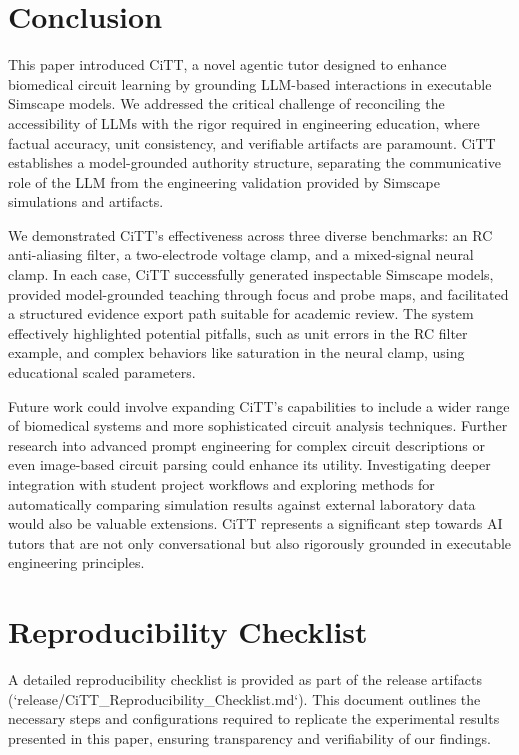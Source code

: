 \documentclass[10pt,twocolumn,letterpaper]{article}
\begin{document}
\section{Conclusion}
\label{sec:conclusion}
This paper introduced CiTT, a novel agentic tutor designed to enhance biomedical circuit learning by grounding LLM-based interactions in executable Simscape models. We addressed the critical challenge of reconciling the accessibility of LLMs with the rigor required in engineering education, where factual accuracy, unit consistency, and verifiable artifacts are paramount. CiTT establishes a model-grounded authority structure, separating the communicative role of the LLM from the engineering validation provided by Simscape simulations and artifacts.

We demonstrated CiTT's effectiveness across three diverse benchmarks: an RC anti-aliasing filter, a two-electrode voltage clamp, and a mixed-signal neural clamp. In each case, CiTT successfully generated inspectable Simscape models, provided model-grounded teaching through focus and probe maps, and facilitated a structured evidence export path suitable for academic review. The system effectively highlighted potential pitfalls, such as unit errors in the RC filter example, and complex behaviors like saturation in the neural clamp, using educational scaled parameters.

Future work could involve expanding CiTT's capabilities to include a wider range of biomedical systems and more sophisticated circuit analysis techniques. Further research into advanced prompt engineering for complex circuit descriptions or even image-based circuit parsing could enhance its utility. Investigating deeper integration with student project workflows and exploring methods for automatically comparing simulation results against external laboratory data would also be valuable extensions. CiTT represents a significant step towards AI tutors that are not only conversational but also rigorously grounded in executable engineering principles.

{
    \small
    
    
}

\appendix
\section{Reproducibility Checklist}
\label{sec:appendix_repro_checklist}
A detailed reproducibility checklist is provided as part of the release artifacts (`release/CiTT_Reproducibility_Checklist.md`). This document outlines the necessary steps and configurations required to replicate the experimental results presented in this paper, ensuring transparency and verifiability of our findings.
\end{document}
